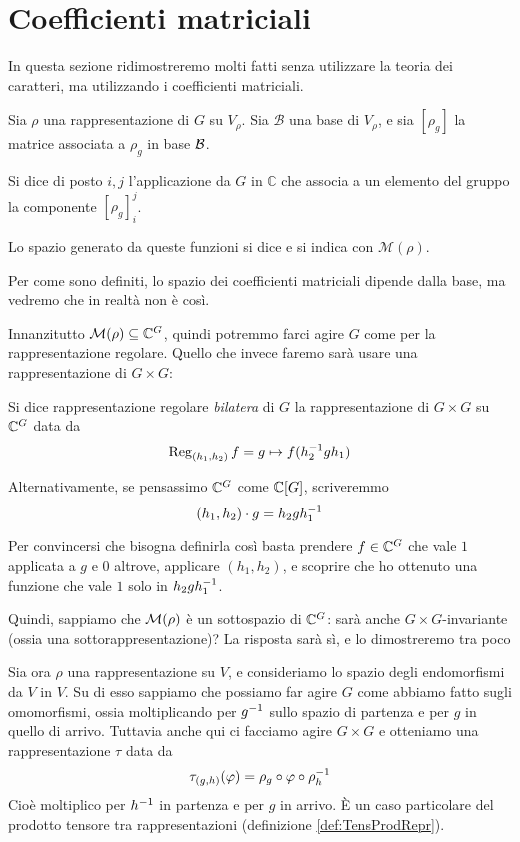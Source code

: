 \section{Coefficienti matriciali}\label{sec:MatEl}
	In questa sezione ridimostreremo molti fatti senza utilizzare la teoria dei caratteri, ma utilizzando i coefficienti matriciali.
	
	\begin{mydef}
		Sia $\rho$ una rappresentazione di $G$ su $V_\rho$. Sia $\mathcal B$ una base di $V_\rho$, e sia $[\rho_g]$ la matrice associata a $\rho_g$ in base $\mathcal B$.
		
		Si dice  di posto $i,j$ l'applicazione da $G$ in $\mathbb C$ che associa a un elemento del gruppo la componente $[\rho_g]_i^j$.
		
		Lo spazio generato da queste funzioni si dice  e si indica con $\mathcal M(\rho)$.
	\end{mydef}
	
	Per come sono definiti, lo spazio dei coefficienti matriciali dipende dalla base, ma vedremo che in realtà non è così.
	
	Innanzitutto $\mathcal M(\rho) \subseteq \mathbb C^{G}$, quindi potremmo farci agire $G$ come per la rappresentazione regolare. Quello che invece faremo sarà usare una rappresentazione di $G\times G$:
	
	\begin{mydef}
		Si dice rappresentazione regolare \emph{bilatera} di $G$ la rappresentazione di $G \times G$ su $\mathbb C^{G}$ data da
		\[
			\operatorname{Reg}_{(h_1,h_2)}f = g \mapsto f(h_2^{-1} g h_1)
		\]
		
		Alternativamente, se pensassimo $\mathbb C^{G}$ come $\mathbb C[G]$, scriveremmo
		\[
			(h_1,h_2)\cdot g = h_2gh_1^{-1}
		\]

	\end{mydef}
	Per convincersi che bisogna definirla così basta prendere $f\in\mathbb C^{G}$ che vale $1$ applicata a $g$ e $0$ altrove, applicare $(h_1,h_2)$, e scoprire che ho ottenuto una funzione che vale $1$ solo in $h_2gh_1^{-1}$.
	
	Quindi, sappiamo che $\mathcal M(\rho)$ è un sottospazio di $\mathbb C^{G}$: sarà anche $G\times G$-invariante (ossia una sottorappresentazione)? La risposta sarà sì, e lo dimostreremo tra poco

	Sia ora $\rho$ una rappresentazione su $V$, e consideriamo lo spazio degli endomorfismi da $V$ in $V$. Su di esso sappiamo che possiamo far agire $G$ come abbiamo fatto sugli omomorfismi, ossia moltiplicando per $g^{-1}$ sullo spazio di partenza e per $g$ in quello di arrivo. Tuttavia anche qui ci facciamo agire $G\times G$ e otteniamo una rappresentazione $\tau$ data da
	\[
		\tau_{(g,h)} (\varphi) = \rho_g \circ \varphi \circ \rho_h^{-1}
	\]
	Cioè moltiplico per $h^{-1}$ in partenza e per $g$ in arrivo. \`E un caso particolare del prodotto tensore tra rappresentazioni (definizione \ref{def:TensProdRepr}).
	
